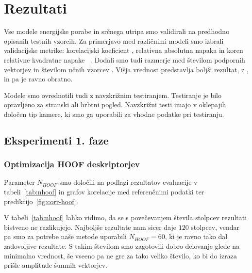 \chapter{Rezultati}\label{sec:rezultati}
Vse modele energijske porabe in srčnega utripa smo validirali na predhodno opisanih testnih vzorcih. Za primerjavo med različnimi modeli smo izbrali validacijske metrike: korelacijski koeficient \corr, relativna absolutna napaka \rae in koren relativne kvadratne napake \rrse~\cite{witten2005data}. Dodali smo tudi razmerje med številom podpornih vektorjev in številom učnih vzorcev \nsv. Višja vrednost \corr predstavlja boljši rezultat, z \rae, \rrse in \nsv pa je ravno obratno.

Modele smo ovrednotili tudi z navzkrižnim testiranjem. Testiranje je bilo opravljeno za stranski ali hrbtni pogled. Navzkrižni testi imajo v oklepajih določen tip kamere, ki smo ga uporabili za vhodne podatke pri testiranju.











\section{Eksperimenti 1. faze}


\subsection{Optimizacija HOOF deskriptorjev}\label{sec:rezultati-optimizacija-hoof}
Parameter $N_{HOOF}$ smo določili na podlagi rezultatov evaluacije v tabeli~\ref{tab:nhoof} in grafov korelacije med referenčnimi podatki ter predikcijo~\ref{fig:corr-hoof}.

V tabeli~\ref{tab:nhoof} lahko vidimo, da se s povečevanjem števila stolpcev rezultati bistveno ne razlikujejo. Najboljše rezultate nam sicer daje $120$ stolpcev, vendar pa smo za potrebe naše metode uporabili $N_{HOOF}=60$, ki je ravno tako dal zadovoljive rezultate. S takim številom smo zagotovili dobro delovanje glede na minimalno vrednost, še vseeno pa ne gre za tako veliko število, ko bi do izraza prišle amplitude šumnih vektorjev.

